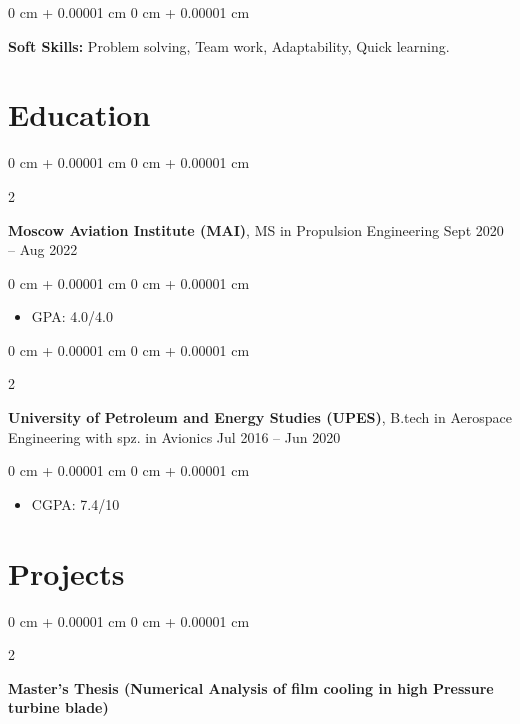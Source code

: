 \documentclass[10pt, letterpaper]{article}
\newenvironment{highlights}{
    \begin{itemize}[
        topsep=0.10 cm,
        parsep=0.10 cm,
        partopsep=0pt,
        itemsep=0pt,
        leftmargin=0 cm + 10pt
    ]
}{
    \end{itemize}
} %
\newenvironment{onecolentry}{
    \begin{adjustwidth}{
        0 cm + 0.00001 cm
    }{
        0 cm + 0.00001 cm
    }
}{
    \end{adjustwidth}
} %
\newenvironment{twocolentry}[2][]{
    \onecolentry
    \def\secondColumn{#2}
    \setcolumnwidth{\fill, 4.5 cm}
    \begin{paracol}{2}
}{
    \switchcolumn \raggedleft \secondColumn
    \end{paracol}
    \endonecolentry
} %
\begin{document}
        \begin{onecolentry}
            \textbf{Soft Skills:} Problem solving, Team work, Adaptability, Quick learning.
        \end{onecolentry}
    
   \section{Education}

        \begin{twocolentry}{
            Sept 2020 – Aug 2022
        }
            \textbf{Moscow Aviation Institute (MAI)}, MS in Propulsion Engineering\end{twocolentry}

        \vspace{0.10 cm}
        \begin{onecolentry}
            \begin{highlights}
                \item GPA: 4.0/4.0
            \end{highlights}
        \end{onecolentry}
        
        \vspace{0.20 cm}
        
        \begin{twocolentry}{
            Jul 2016 – Jun 2020
        }
            \textbf{University of Petroleum and Energy Studies (UPES)}, B.tech in Aerospace Engineering with spz. in Avionics\end{twocolentry}

        \vspace{0.10 cm}
        \begin{onecolentry}
            \begin{highlights}
                \item CGPA: 7.4/10
            \end{highlights}
        \end{onecolentry}


    \section{Projects}

        \vspace{0.10 cm}
        \begin{twocolentry}{
            2022
        }
            \textbf{Master's Thesis (Numerical Analysis of film cooling in high Pressure turbine blade)}\end{twocolentry}
\end{document}
